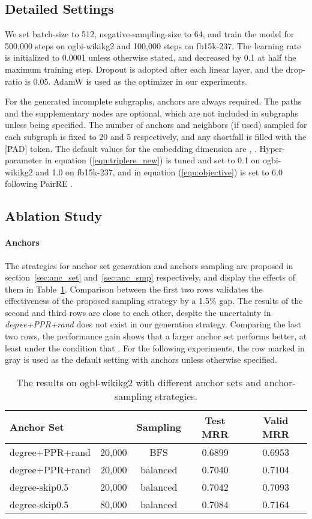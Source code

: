\documentclass{article}
\begin{document}
\subsection{Detailed Settings}
We set batch-size to 512, negative-sampling-size to 64, and train the model for 500,000 steps on ogbi-wikikg2 and 100,000 steps on fb15k-237. The learning rate is initialized to 0.0001 unless otherwise stated, and decreased by 0.1 at half the maximum training step. Dropout is adopted after each linear layer, and the drop-ratio is 0.05. AdamW is used as the optimizer in our experiments.

For the generated incomplete subgraphs, anchors are always required. The paths and the supplementary nodes are optional, which are not included in subgraphs unless being specified. The number of anchors and neighbors (if used) sampled for each subgraph is fixed to 20 and 5 respectively, and any shortfall is filled with the [PAD] token. The default values for the embedding dimension are , . 
Hyper-parameter  in equation (\ref{equ:triplere_new}) is tuned and set to 0.1 on ogbi-wikikg2 and 1.0 on fb15k-237, and  in equation (\ref{equ:objective}) is set to 6.0 following PairRE \cite{chao2021pairre}.

\subsection{Ablation Study}
\label{sec:ablation}
\paragraph{Anchors} The strategies for anchor set generation and anchors sampling are proposed in section~\ref{sec:anc_set} and~\ref{sec:anc_smp} respectively, and display the effects of them in Table~\ref{tab:anchors}. Comparison between the first two rows validates the effectiveness of the proposed sampling strategy by a 1.5\% gap. The results of the second and third rows are close to each other, despite the uncertainty in \emph{degree+PPR+rand} does not exist in our generation strategy. Comparing the last two rows, the performance gain shows that a larger anchor set performs better, at least under the condition that .
 For the following experiments, the row marked in gray is used as the default setting with anchors unless otherwise specified.
\begin{table}
 \caption{The results on ogbl-wikikg2 with different anchor sets and anchor-sampling strategies.}
 \centering
 \begin{tabular}{lcc|cc}
 \toprule
 Anchor Set &  & Sampling & Test MRR & Valid MRR \\
 \midrule
 degree+PPR+rand \cite{galkin2022nodepiece} & 20,000 & BFS & 0.6899 & 0.6953 \\
 degree+PPR+rand \cite{galkin2022nodepiece} & 20,000 & balanced & 0.7040 & 0.7104 \\
 \rowcolor{gray!30}degree-skip0.5 & 20,000 & balanced & 0.7042 & 0.7093 \\
 degree-skip0.5 & 80,000 & balanced & 0.7084 & 0.7164 \\
 \bottomrule
 \end{tabular}
 \label{tab:anchors}
\end{table}
\end{document}
